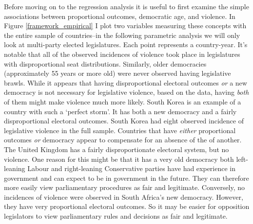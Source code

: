 \documentclass[a4paper]{article}\usepackage{graphicx, color}
\begin{document}
Before moving on to the regression analysis it is useful to first examine the simple associations between proportional outcomes, democratic age, and violence. In Figure \ref{framework_empirical} I plot two variables measuring these concepts with the entire sample of countries--in the following parametric analysis we will only look at multi-party elected legislatures. Each point represents a country-year. It's notable that all of the observed incidences of violence took place in legislatures with disproportional seat distributions. Similarly, older democracies (approximately 55 years or more old) were never observed having legislative brawls. While it appears that having disproportional electoral outcomes \emph{or} a new democracy is not necessary for legislative violence, based on the data, having \emph{both} of them might make violence much more likely. South Korea is an example of a country with such a `perfect storm'. It has both a new democracy and a fairly disproportional electoral outcomes. South Korea had eight observed incidence of legislative violence in the full sample. Countries that have \emph{either} proportional outcomes \emph{or} democracy appear to compensate for an absence of the of another. The United Kingdom has a fairly disproportionate electoral system, but no violence. One reason for this might be that it has a very old democracy both left-leaning Labour and right-leaning Conservative parties have had experience in government and can expect to be in government in the future. They can therefore more easily view parliamentary procedures as fair and legitimate. Conversely, no incidences of violence were observed in South Africa's new democracy. However, they have very proportional electoral outcomes. So it may be easier for opposition legislators to view parliamentary rules and decisions as fair and legitimate.
\end{document}
